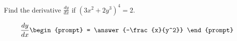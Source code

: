 \documentclass{ximera}
\author{Gregory Hartman \and Matthew Carr}
\begin{document}
\begin{exercise}




Find the derivative $\frac{dy}{dx}$ if $(3x^2+2y^3)^4=2$.

\[
\frac{dy}{dx}
\begin{prompt}
= \answer{-\frac{x}{y^2}}
\end{prompt}
\]


\end{exercise}
\end{document}
